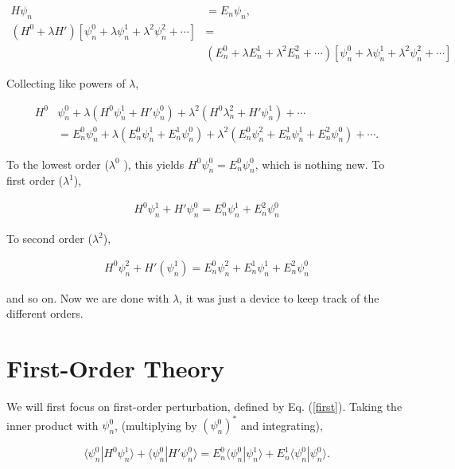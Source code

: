 \documentclass[svgnames]{article}     %
\begin{document}
\begin{align*} \label{}
  H\psi_n &= E_n \psi_n, \\
  (H^0+ \lambda H') \left[ \psi_n^0 + \lambda \psi_n^1 + \lambda^2 \psi_n^2
+ \cdots \right] &= \\ &\left(E_n^0 + \lambda E_n^1 + \lambda^2 E_n^2 + \cdots
\right) \left[\psi_n^0 + \lambda \psi_n^1 + \lambda^2\psi_n^2 + \cdots \right]
\end{align*}\vspace{3px}

Collecting like powers of $\lambda$, 

\begin{align*}
  H^0 &\psi_n^0 + \lambda (H^0 \psi_n^1 + H'\psi_n^0) + \lambda^2(H^0
  \lambda_n^2 + H' \psi_n^1) + \cdots \\ &= E_n^0 \psi_n^0 + \lambda
  (E_n^0\psi_n^1 + E_n^1 \psi_n^0) + \lambda^2 (E_n^0 \psi_n^2 + E_n^1 \psi_n^1
  + E_n^2\psi_n^0) + \cdots.
\end{align*}

To the lowest order ($\lambda^0$ ), this yields $H^0\psi_n^0 = E_n^0 \psi_n^0$,
which is nothing new. To first order ($\lambda^1$), 

 \begin{align} \label{first}
  H^0\psi_n^1 + H'\psi_n^0 = E_n^0\psi_n^1 + E_n^2\psi_n^0
\end{align}\vspace{3px}

To second order ($\lambda^2$), 

\begin{align} \label{second}
  H^0\psi_n^2 + H'(\psi_n^1) = E_n^0\psi_n^2 + E_n^1 \psi_n^1 + E_n^2 \psi_n^0
\end{align}

and so on. Now we are done with $\lambda$, it was just a device to keep track
of the different orders. 

\section{First-Order Theory} 

We will first focus on first-order perturbation, defined by Eq. (\ref{first}).
Taking the inner product with $\psi_n^0$, (multiplying by $(\psi_n^0)^*$ and
integrating), 

\[
\langle \psi_n^0 | H^0 \psi_n^1 \rangle + \langle \psi_n^0 | H' \psi_n^0
\rangle = E_n^0 \langle \psi_n^0 | \psi_n^1\rangle + E_n^1 \langle \psi_n^0
| \psi_n^0 \rangle. 
\] \vspace{3px}
\end{document}
